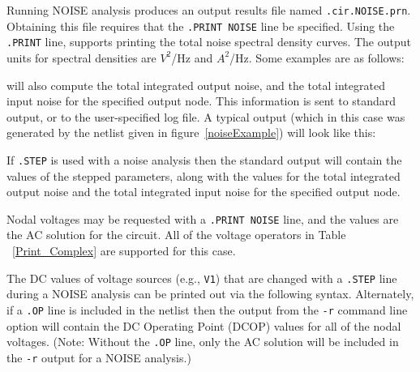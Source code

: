 \label{NOISE_print}

Running \Xyce{} NOISE analysis produces an output results file named
\verb|.cir.NOISE.prn|. Obtaining this file requires that the
\verb|.PRINT NOISE| line be specified. Using the \texttt{.PRINT} line,
\Xyce{} supports printing the total noise spectral density curves.
The output units for spectral densities are $V^2$/Hz and $A^2$/Hz.
Some examples are as follows:


\Xyce{} will also compute the total integrated output noise, and the
total integrated input noise for the specified output node.  This
information is sent to standard output, or to the user-specified log
file.  A typical output (which in this case was generated by the
netlist given in figure~\ref{noiseExample}) will look like this:


If \texttt{.STEP} is used with a noise analysis then the \Xyce{}
standard output will contain the values of the stepped parameters,
along with the values for the total integrated output noise and the
total integrated input noise for the specified output node.

Nodal voltages may be requested with a \verb|.PRINT NOISE| line, and
the values are the AC solution for the circuit.  All of the voltage
operators in Table ~\ref{Print_Complex} are supported for this case.

The DC values of voltage sources (e.g., \texttt{V1}) that are changed
with a \verb|.STEP| line during a NOISE analysis can be printed out
via the following syntax. Alternately, if a \verb|.OP| line is
included in the netlist then the output from the \verb+-r+ command
line option will contain the DC Operating Point (DCOP) values for all
of the nodal voltages.  (Note: Without the \verb|.OP| line, only the
AC solution will be included in the \verb+-r+ output for a NOISE
analysis.)

